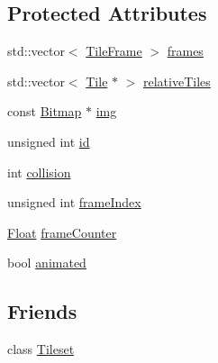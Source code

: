 \subsection*{Protected Attributes}
\begin{DoxyCompactItemize}
\item 
std\+::vector$<$ \hyperlink{structZeta_1_1Tile_1_1TileFrame}{Tile\+Frame} $>$ \hyperlink{classZeta_1_1Tile_a7bb5f244f2fcfd4d1555b1fc34ed83bf}{frames}
\item 
std\+::vector$<$ \hyperlink{classZeta_1_1Tile}{Tile} $\ast$ $>$ \hyperlink{classZeta_1_1Tile_a87ad7f87310b4f614a91027f2eb80ac6}{relative\+Tiles}
\item 
const \hyperlink{classZeta_1_1Bitmap}{Bitmap} $\ast$ \hyperlink{classZeta_1_1Tile_a07ecd5534c5706c34caa24b76d1f7732}{img}
\item 
unsigned int \hyperlink{classZeta_1_1Tile_a73e4f7fc4c4770d3dd4ddd823f168944}{id}
\item 
int \hyperlink{classZeta_1_1Tile_a14528e0a0089ba6d1ef9c7212b0979ef}{collision}
\item 
unsigned int \hyperlink{classZeta_1_1Tile_a82054179dbf538fb3f4fb90d27f3c989}{frame\+Index}
\item 
\hyperlink{namespaceZeta_a1e0a1265f9b3bd3075fb0fabd39088ba}{Float} \hyperlink{classZeta_1_1Tile_a75c9f1e8284016d616ff77d45be4b4c7}{frame\+Counter}
\item 
bool \hyperlink{classZeta_1_1Tile_abbdf92d372e2f64b3d5fdbbcd802c65d}{animated}
\end{DoxyCompactItemize}
\subsection*{Friends}
\begin{DoxyCompactItemize}
\item 
class \hyperlink{classZeta_1_1Tile_ad3a332aadb166ba7a00d4f642709063e}{Tileset}
\end{DoxyCompactItemize}


